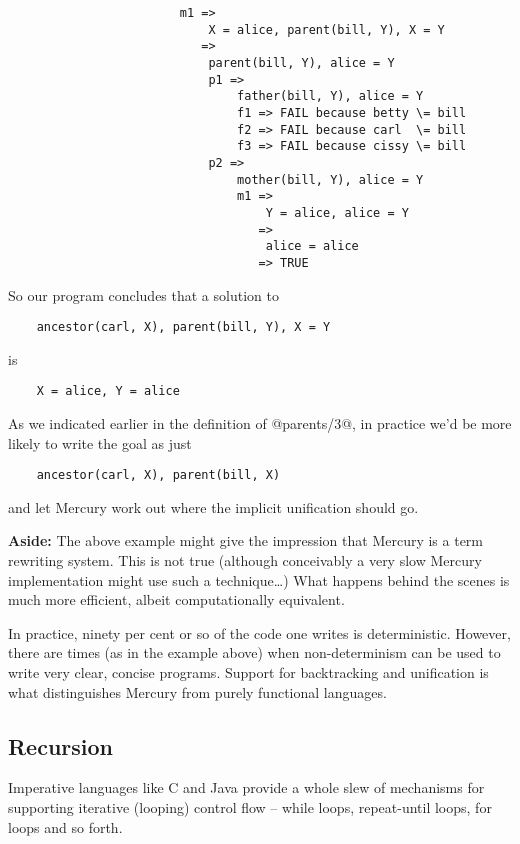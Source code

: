 \documentclass[a4paper,11pt,notitlepage,onecolumn]{article}
\newcommand{\Aside}[1]%
{{\small{\begin{description}\item{\textbf{Aside:}} #1\end{description}}}}
\begin{document}
\begin{verbatim}
                        m1 =>
                            X = alice, parent(bill, Y), X = Y
                           =>
                            parent(bill, Y), alice = Y
                            p1 =>
                                father(bill, Y), alice = Y
                                f1 => FAIL because betty \= bill
                                f2 => FAIL because carl  \= bill
                                f3 => FAIL because cissy \= bill
                            p2 =>
                                mother(bill, Y), alice = Y
                                m1 =>
                                    Y = alice, alice = Y
                                   =>
                                    alice = alice
                                   => TRUE
\end{verbatim}
So our program concludes that a solution to
\begin{verbatim}
    ancestor(carl, X), parent(bill, Y), X = Y
\end{verbatim}
is
\begin{verbatim}
    X = alice, Y = alice
\end{verbatim}
As we indicated earlier in the definition of @parents/3@, in
practice we'd be more likely to write the goal as just
\begin{verbatim}
    ancestor(carl, X), parent(bill, X)
\end{verbatim}
and let Mercury work out where the implicit unification should
go.

\Aside{The above example might give the impression that Mercury is a term
rewriting system.  This is not true (although conceivably a very
slow Mercury implementation might use such a technique\ldots)  What
happens behind the scenes is much more efficient, albeit
computationally equivalent.}

In practice, ninety per cent or so of the code one writes is
deterministic.  However, there are times (as in the example above) when
non-determinism can be used to write very clear, concise programs.
Support for backtracking and unification is what distinguishes Mercury
from purely functional languages.

\subsection{Recursion}

Imperative languages like C and Java provide a whole slew of
mechanisms for supporting iterative (looping) control flow --
while loops, repeat-until loops, for loops and so forth.
\end{document}
